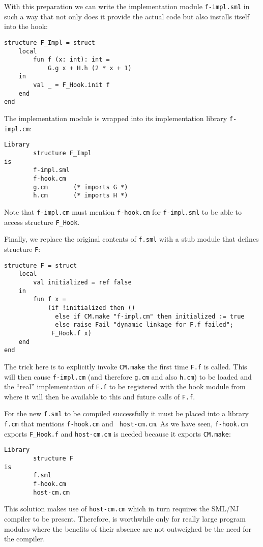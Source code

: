 \documentclass{article}
\begin{document}
With this preparation we can write the implementation module {\tt f-impl.sml}
in such a way that not only does it provide the actual
code but also installs itself into the hook:
\begin{verbatim}
structure F_Impl = struct
    local
        fun f (x: int): int =
            G.g x + H.h (2 * x + 1)
    in
        val _ = F_Hook.init f
    end
end
\end{verbatim}
\noindent The implementation module is wrapped into its implementation
library {\tt f-impl.cm}:
\begin{verbatim}
Library
        structure F_Impl
is
        f-impl.sml
        f-hook.cm
        g.cm       (* imports G *)
        h.cm       (* imports H *)
\end{verbatim}
\noindent Note that {\tt f-impl.cm} must mention {\tt f-hook.cm} for
{\tt f-impl.sml} to be able to access structure {\tt F\_Hook}.

Finally, we replace the original contents of {\tt f.sml} with a stub
module that defines structure {\tt F}:
\begin{verbatim}
structure F = struct
    local
        val initialized = ref false
    in
        fun f x =
            (if !initialized then ()
              else if CM.make "f-impl.cm" then initialized := true
              else raise Fail "dynamic linkage for F.f failed";
             F_Hook.f x)
    end
end
\end{verbatim}
\noindent The trick here is to explicitly invoke {\tt CM.make} the
first time {\tt F.f} is called.  This will then cause {\tt f-impl.cm}
(and therefore {\tt g.cm} and also {\tt h.cm}) to be loaded and the
``real'' implementation of {\tt F.f} to be registered with the hook
module from where it will then be available to this and future calls
of {\tt F.f}.

For the new {\tt f.sml} to be compiled successfully it must be placed
into a library {\tt f.cm} that mentions {\tt f-hook.cm} and {\tt
host-cm.cm}.  As we have seen, {\tt f-hook.cm} exports {\tt F\_Hook.f}
and {\tt host-cm.cm} is needed because it exports {\tt CM.make}:
\begin{verbatim}
Library
        structure F
is
        f.sml
        f-hook.cm
        host-cm.cm
\end{verbatim}

  This solution makes use of {\tt host-cm.cm}
which in turn requires the SML/NJ compiler to be present.  Therefore,
is worthwhile only for really large program modules where the benefits
of their absence are not outweighed be the need for the compiler.
\end{document}
